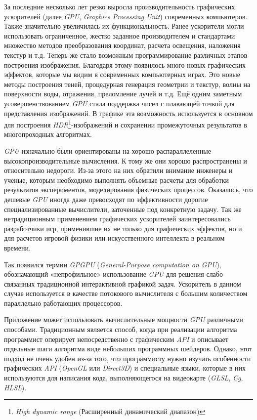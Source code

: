 За последние несколько лет резко выросла производительность графических ускорителей (далее \emph{GPU}, \emph{Graphics Processing Unit}) современных компьютеров. Также значительно увеличилась их функциональность. Ранее ускорители могли использовать ограниченное, жестко заданное производителем и стандартами множество методов преобразования координат, расчета освещения, наложения текстур и т.д. Теперь же стало возможным программирование различных этапов построения изображения. Благодаря этому появилось много новых графических эффектов, которые мы видим в современных компьютерных играх. Это новые методы построения теней, процедурная генерация геометрии и текстур, волны на поверхности воды, отражения, преломление лучей и т.д. Ещё одним заметным усовершенствованием \emph{GPU} стала поддержка чисел с плавающей точкой для представления изображений. В графике эта возможность используется в основном для построения \emph{HDR}\footnote{\emph{High dynamic range} (Расширенный динамический диапазон)}-изображений и сохранении промежуточных результатов в многопроходных алгоритмах.

\emph{GPU} изначально были ориентированы на хорошо распараллеленные высокопроизводительные вычисления. К тому же они хорошо распространены и относительно недороги. Из-за этого на них обратили внимание инженеры и ученые, которым необходимо выполнять объемные расчеты для обработки результатов экспериментов, моделирования физических процессов. Оказалось, что дешевые \emph{GPU} иногда даже превосходят по эффективности дорогие специализированные вычислители, заточенные под конкретную задачу. Так же нетрадиционным применением графических ускорителей заинтересовались разработчики игр, применившие их не только для графических эффектов, но и для расчетов игровой физики или искусственного интеллекта в реальном времени.

Так появился термин \emph{GPGPU} (\emph{General-Purpose computation on GPU}), обозначающий «непрофильное» использование \emph{GPU} для решения слабо связанных традиционной интерактивной графикой задач. Ускоритель в данном случае используется в качестве потокового вычислителя с большим количеством параллельно работающих процессоров.

Приложение может использовать вычислительные мощности \emph{GPU} различными способами. Традиционным является способ, когда при реализации алгоритма программист оперирует непосредственно с графическим \emph{API} и описывает отдельные шаги алгоритма виде небольших программных шейдеров. Однако, этот подход не очень удобен из-за того, что программисту нужно изучать особенности графических \emph{API} (\emph{OpenGL} или \emph{Direct3D}) и специальные языки, которые в них используются для написания кода, выполняющегося на видеокарте (\emph{GLSL}, \emph{Cg}\cite{cg:2005}, \emph{HLSL}).

